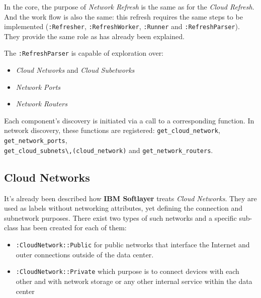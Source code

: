 In the core, the purpose of \emph{Network Refresh} is the same as for the \emph{Cloud Refresh}. And the work flow is also the same: this refresh requires the same steps to be implemented (\verb|:Refresher|, \verb|:RefreshWorker|, \verb|:Runner| and \verb|:RefreshParser|). They provide the same role as has already been explained.

The \verb|:RefreshParser| is capable of exploration over:

\begin{itemize}
	\item \emph{Cloud Networks} and \emph{Cloud Subetworks}
	\item \emph{Network Ports}
	\item \emph{Network Routers}
\end{itemize}

Each component's discovery is initiated via a call to a corresponding function. In network discovery, these functions are registered: \verb|get_cloud_network|, \verb|get_network_ports|, \\ \verb|get_cloud_subnets\,(cloud_network)| and \verb|get_network_routers|.

\clearpage
\subsection{Cloud Networks}
\label{sub:Cloud Networks}

It's already been described how \textbf{IBM Softlayer} treats \emph{Cloud Networks}. They are used as labels without networking attributes, yet defining the connection and subnetwork purposes. There exist two types of such networks and a specific sub-class has been created for each of them:

\begin{itemize}
	\item \verb|:CloudNetwork::Public| for public networks that interface the Internet and outer connections outside of the data center.
	\item \verb|:CloudNetwork::Private| which purpose is to connect devices with each other and with network storage or any other internal service within the data center
\end{itemize}

